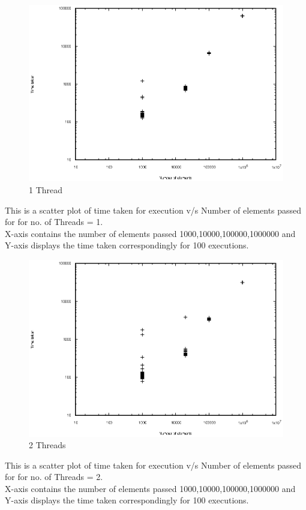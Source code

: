 \documentclass{article}
\begin{document}
\maketitle

\clearpage
\begin{figure}
\includegraphics[width=\linewidth]{scatter1.eps}
\caption{1 Thread}
\label{fig:Scatter1 graph}
\end{figure}
\noindent
This is a scatter plot of time taken for execution v/s Number of elements passed for for no. of Threads = 1. \\
X-axis contains the number of elements passed {1000,10000,100000,1000000} and Y-axis displays the time taken correspondingly for 100 executions.
\clearpage

\begin{figure}
\includegraphics[width=\linewidth]{scatter2.eps}
\caption{2 Threads}
\label{fig:Scatter2 graph}
\end{figure}
\noindent
This is a scatter plot of time taken for execution v/s Number of elements passed for for no. of Threads = 2. \\
X-axis contains the number of elements passed {1000,10000,100000,1000000} and Y-axis displays the time taken correspondingly for 100 executions.
\clearpage
\end{document}
